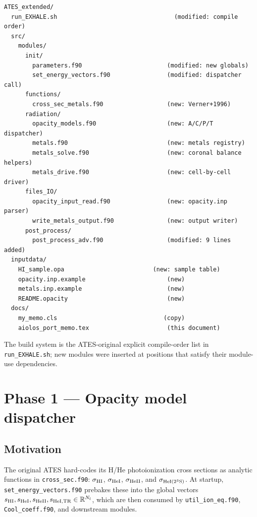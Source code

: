 \documentclass[english,a4paper]{my_memo}
\begin{document}
\begin{verbatim}
ATES_extended/
  run_EXHALE.sh                                 (modified: compile order)
  src/
    modules/
      init/
        parameters.f90                        (modified: new globals)
        set_energy_vectors.f90                (modified: dispatcher call)
      functions/
        cross_sec_metals.f90                  (new: Verner+1996)
      radiation/
        opacity_models.f90                    (new: A/C/P/T dispatcher)
        metals.f90                            (new: metals registry)
        metals_solve.f90                      (new: coronal balance helpers)
        metals_drive.f90                      (new: cell-by-cell driver)
      files_IO/
        opacity_input_read.f90                (new: opacity.inp parser)
        write_metals_output.f90               (new: output writer)
      post_process/
        post_process_adv.f90                  (modified: 9 lines added)
  inputdata/
    HI_sample.opa                         (new: sample table)
    opacity.inp.example                       (new)
    metals.inp.example                        (new)
    README.opacity                            (new)
  docs/
    my_memo.cls                              (copy)
    aiolos_port_memo.tex                      (this document)
\end{verbatim}

The build system is the ATES-original explicit compile-order list in
\texttt{run\_EXHALE.sh}; new modules were inserted at positions that satisfy
their module-use dependencies.

\section{Phase 1 --- Opacity model dispatcher}

\subsection{Motivation}

The original ATES hard-codes its H/He photoionization cross sections as
analytic functions in \texttt{cross\_sec.f90}: $\sigma_{\rm HI}$,
$\sigma_{\rm HeI}$, $\sigma_{\rm HeII}$, and $\sigma_{\rm HeI(2^3S)}$. At
startup, \texttt{set\_energy\_vectors.f90} prebakes these into the global
vectors $s_{\rm HI}, s_{\rm HeI}, s_{\rm HeII}, s_{\rm HeI{,}TR} \in
\mathbb{R}^{N_l}$, which are then consumed by \texttt{util\_ion\_eq.f90},
\texttt{Cool\_coeff.f90}, and downstream modules.
\end{document}

